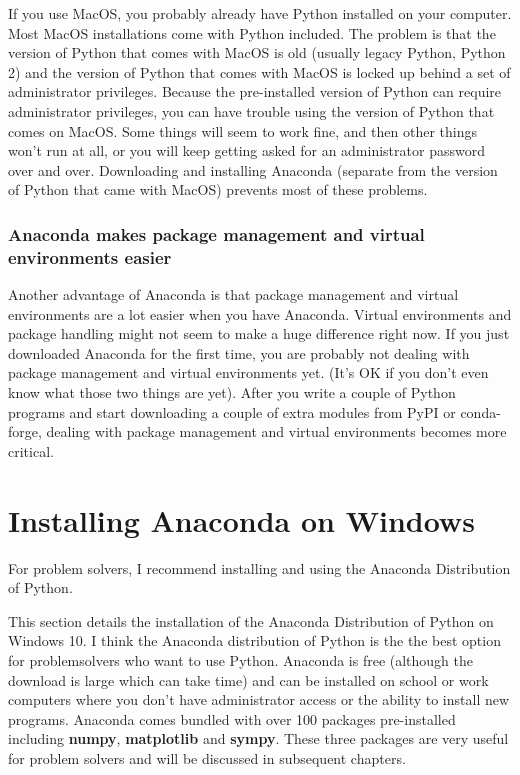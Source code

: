 \documentclass{book}
\begin{document}
If you use MacOS, you probably already have Python installed on your
computer. Most MacOS installations come with Python included. The
problem is that the version of Python that comes with MacOS is old
(usually legacy Python, Python 2) and the version of Python that comes
with MacOS is locked up behind a set of administrator privileges.
Because the pre-installed version of Python can require administrator
privileges, you can have trouble using the version of Python that comes
on MacOS. Some things will seem to work fine, and then other things
won't run at all, or you will keep getting asked for an administrator
password over and over. Downloading and installing Anaconda (separate
from the version of Python that came with MacOS) prevents most of these
problems.

\subsubsection{Anaconda makes package management and virtual
environments
easier}\label{anaconda-makes-package-management-and-virtual-environments-easier}

Another advantage of Anaconda is that package management and virtual
environments are a lot easier when you have Anaconda. Virtual
environments and package handling might not seem to make a huge
difference right now. If you just downloaded Anaconda for the first
time, you are probably not dealing with package management and virtual
environments yet. (It's OK if you don't even know what those two things
are yet). After you write a couple of Python programs and start
downloading a couple of extra modules from PyPI or conda-forge, dealing
with package management and virtual environments becomes more critical.

    \section{Installing Anaconda on
Windows}\label{installing-anaconda-on-windows}

    For problem solvers, I recommend installing and using the Anaconda
Distribution of Python.

    This section details the installation of the Anaconda Distribution of
Python on Windows 10. I think the Anaconda distribution of Python is the
the best option for problemsolvers who want to use Python. Anaconda is
free (although the download is large which can take time) and can be
installed on school or work computers where you don't have administrator
access or the ability to install new programs. Anaconda comes bundled
with over 100 packages pre-installed including \textbf{numpy},
\textbf{matplotlib} and \textbf{sympy}. These three packages are very
useful for problem solvers and will be discussed in subsequent chapters.
\end{document}
